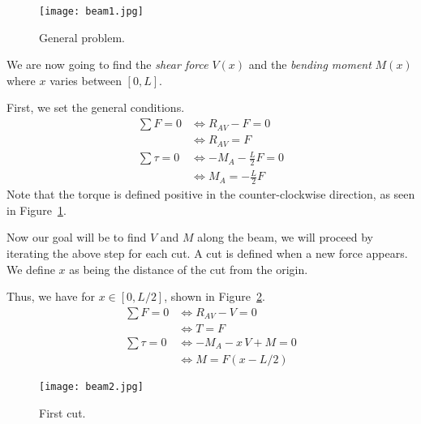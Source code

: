 
\begin{figure}[h]
  \begin{center}
    \texttt{[image: beam1.jpg]}
    \caption{General problem.}
    \label{fig:beam_1}
  \end{center}
\end{figure}

We are now going to find the \emph{shear force} $V(x)$
and the \emph{bending moment} $M(x)$ where $x$ varies between $[0,L]$.

First, we set the general conditions.
\begin{align*}
  \sum F = 0 &\iff R_{AV} - F = 0 \\
  &\iff R_{AV} = F \\
  \sum \tau = 0 &\iff -M_A - \frac{L}{2} F = 0 \\
  &\iff M_A = - \frac{L}{2} F
\end{align*}
Note that the torque is defined positive in the 
counter-clockwise direction, as seen in Figure~\ref{fig:beam_1}.

Now our goal will be to find $V$ and $M$ along the beam,
we will proceed by iterating the above step for each cut.
A cut is defined when a new force appears.
We define $x$ as being the distance of the cut from the origin.

Thus, we have for $x \in [0,L/2]$, shown in Figure~\ref{fig:beam_2}.
\begin{align}
  \sum F = 0 &\iff R_{AV} - V = 0 \nonumber \\
  &\iff T = F \label{eq:beam_V_cut1}\\
  \sum \tau = 0 &\iff -M_A - x\, V + M = 0 \nonumber \\
  &\iff M = F (x - L/2) \label{eq:beam_M_cut1}
\end{align}

\begin{figure}[h]
  \begin{center}
    \texttt{[image: beam2.jpg]}
    \caption{First cut.}
    \label{fig:beam_2}
  \end{center}
\end{figure}

